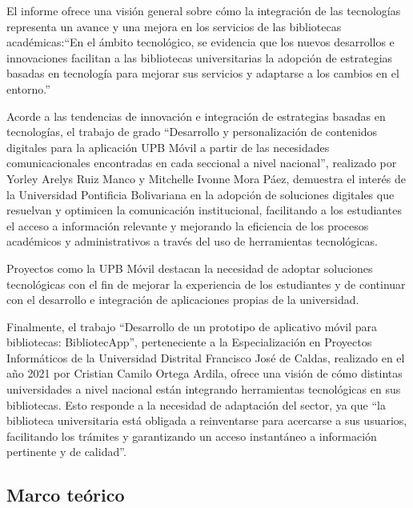 \documentclass[spanish]{ieee_upb}
\begin{document}
El informe ofrece una visión general sobre cómo la integración de las tecnologías representa un avance y una mejora en los servicios de las bibliotecas académicas:``En el ámbito tecnológico, se evidencia que los nuevos desarrollos e innovaciones facilitan a las bibliotecas universitarias la adopción de estrategias basadas en tecnología para mejorar sus servicios y adaptarse a los cambios en el entorno.''\cite{unal_87281}
\vspace{0.3 cm}

Acorde a las tendencias de innovación e integración de estrategias basadas en tecnologías, el trabajo de grado “Desarrollo y personalización de contenidos digitales para la aplicación UPB Móvil a partir de las necesidades comunicacionales encontradas en cada seccional a nivel nacional”, realizado por Yorley Arelys Ruiz Manco y Mitchelle Ivonne Mora Páez, demuestra el interés de la Universidad Pontificia Bolivariana en la adopción de soluciones digitales que resuelvan y optimicen la comunicación institucional, facilitando a los estudiantes el acceso a información relevante y mejorando la eficiencia de los procesos académicos y administrativos a través del uso de herramientas tecnológicas.
\vspace{0.3 cm}

Proyectos como la UPB Móvil \cite{ruiz2017desarrollo} destacan la necesidad de adoptar soluciones tecnológicas con el fin de mejorar la experiencia de los estudiantes y de continuar con el desarrollo e integración de aplicaciones propias de la universidad.
\vspace{0.3 cm}

Finalmente, el trabajo “Desarrollo de un prototipo de aplicativo móvil para bibliotecas: BibliotecApp”, perteneciente a la Especialización en Proyectos Informáticos de la Universidad Distrital Francisco José de Caldas, realizado en el año 2021 por Cristian Camilo Ortega Ardila, ofrece una visión de cómo distintas universidades a nivel nacional están integrando herramientas tecnológicas en sus bibliotecas. Esto responde a la necesidad de adaptación del sector, ya que “la biblioteca universitaria está obligada a reinventarse para acercarse a sus usuarios, facilitando los trámites y garantizando un acceso instantáneo a información pertinente y de calidad”. \cite{ortegadesarrollo}

\subsection{Marco teórico}
\end{document}
